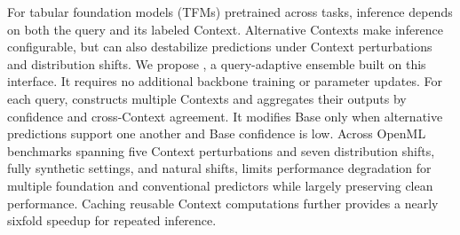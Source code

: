 For tabular foundation models (TFMs) pretrained across tasks, inference
depends on both the query and its labeled Context. Alternative Contexts make
inference configurable, but can also destabilize predictions under Context
perturbations and distribution shifts. We propose \textbf{\method{}}, a
query-adaptive ensemble built on this interface. It requires no additional
backbone training or parameter updates. For each query, \method{} constructs multiple
Contexts and aggregates their outputs by confidence and cross-Context agreement.
It modifies Base only when alternative predictions support one another and Base
confidence is low. Across OpenML benchmarks spanning five Context perturbations
and seven distribution shifts, fully synthetic settings, and natural shifts,
\method{} limits performance degradation for multiple foundation and
conventional predictors while largely preserving clean performance. Caching
reusable Context computations further provides a nearly sixfold speedup for
repeated inference.
